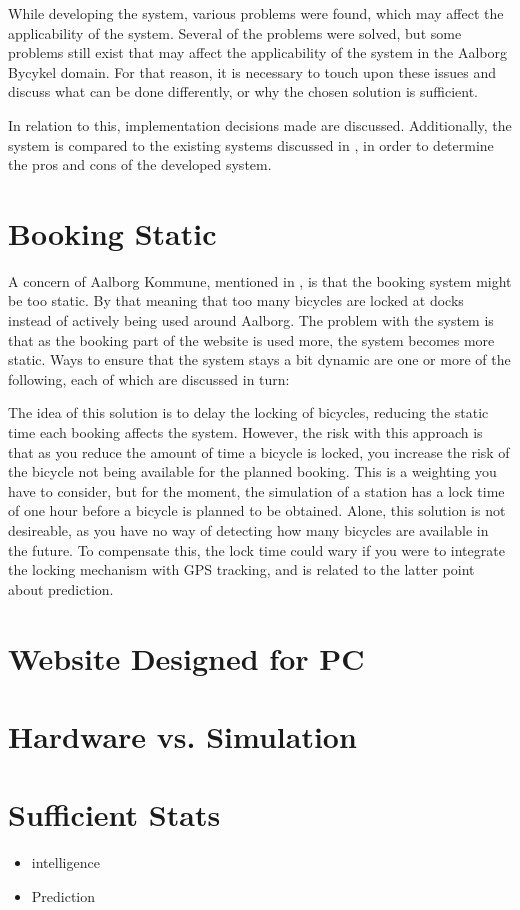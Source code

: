 While developing the system, various problems were found, which may affect the applicability of the system.
Several of the problems were solved, but some problems still exist that may affect the applicability of the system in the Aalborg Bycykel domain.
For that reason, it is necessary to touch upon these issues and discuss what can be done differently, or why the chosen solution is sufficient.

In relation to this, implementation decisions made are discussed.
Additionally, the system is compared to the existing systems discussed in , in order to determine the pros and cons of the developed system.

\section*{Booking Static}
A concern of Aalborg Kommune, mentioned in , is that the booking system might be too static.
By that meaning that too many bicycles are locked at docks instead of actively being used around Aalborg.
The problem with the system is that as the booking part of the website is used more, the system becomes more static.
Ways to ensure that the system stays a bit dynamic are one or more of the following, each of which are discussed in turn:

\begin{description}[style=nextline]
		\item[Lock late]
		The idea of this solution is to delay the locking of bicycles, reducing the static time each booking affects the system.
		However, the risk with this approach is that as you reduce the amount of time a bicycle is locked, you increase the risk of the bicycle not being available for the planned booking.
		This is a weighting you have to consider, but for the moment, the simulation of a station has a lock time of one hour before a bicycle is planned to be obtained.
		Alone, this solution is not desireable, as you have no way of detecting how many bicycles are available in the future.
		To compensate this, the lock time could wary if you were to integrate the locking mechanism with GPS tracking, and is related to the latter point about prediction.
		
		\item[Subset of bicycles for booking]
		\item[Prediction]
\end{description}

\section*{Website Designed for PC}

\section*{Hardware vs. Simulation}

\section*{Sufficient Stats}
	\begin{itemize}
		\item intelligence
		\item Prediction
	\end{itemize}